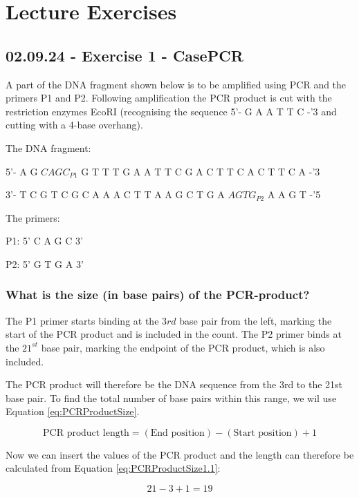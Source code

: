 \chapter{Lecture Exercises}
\setlength{\headheight}{22.94003pt}
\addtolength{\topmargin}{-10.22661pt}

\section{02.09.24 - Exercise 1 - CasePCR}
A part of the DNA fragment shown below is to be amplified using PCR and the primers P1 and P2. Following amplification the PCR product is cut with the restriction enzymes EcoRI (recognising the sequence 5'- G A A T T C -'3 and cutting with a 4-base overhang).

The DNA fragment:

5'-	A G	\underline{$C A G C_{P1}$}	G T	T T	G A	A T	T C	G A	C T	T C	A C	T T	C A	-'3

3'-	T C	G T	C G	C A	A A	C T	T A	A G	C T	G A	\underline{$A G T G_{P2}$}	A A	G T	-'5

The primers:

P1: 5’ C A G C 3’	

P2: 5’ G T G A 3’

\subsection*{What is the size (in base pairs) of the PCR-product?}
The P1 primer starts binding at the $3{rd}$ base pair from the left, marking the start of the PCR product and is included in the count. The P2 primer binds at the $21^{st}$ base pair, marking the endpoint of the PCR product, which is also included.

The PCR product will therefore be the DNA sequence from the 3rd to the 21st base pair. To find the total number of base pairs within this range, we wil use Equation \ref{eq:PCRProductSize}.

\begin{equation}
    \text{PCR product length} = (\text{End position}) - (\text{Start position}) + 1
    \label{eq:PCRProductSize}
\end{equation}

Now we can insert the values of the PCR product and the length can therefore be calculated from Equation \ref{eq:PCRProductSize1.1}:

\begin{equation}
    21 - 3 + 1 = 19
    \label{eq:PCRProductSize1.1}
\end{equation}

